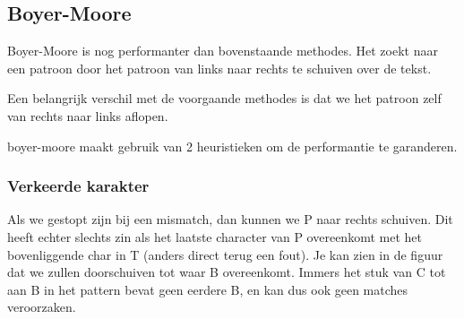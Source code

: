 \subsection{Boyer-Moore}
Boyer-Moore is nog performanter dan bovenstaande methodes. Het zoekt naar een patroon door het patroon van links naar rechts te schuiven over de tekst. \\

Een belangrijk verschil met de voorgaande methodes is dat we het patroon zelf van rechts naar links aflopen.\\

boyer-moore maakt gebruik van 2 heuristieken om de performantie te garanderen.
\clearpage
\subsubsection{Verkeerde karakter}
Als we gestopt zijn bij een mismatch, dan kunnen we P naar rechts schuiven. Dit heeft echter slechts zin als het laatste character van P overeenkomt met het bovenliggende char in T (anders direct terug een fout). Je kan zien in de figuur dat we zullen doorschuiven tot waar B overeenkomt. Immers het stuk van C tot aan B in het pattern bevat geen eerdere B, en kan dus ook geen matches veroorzaken.\\

